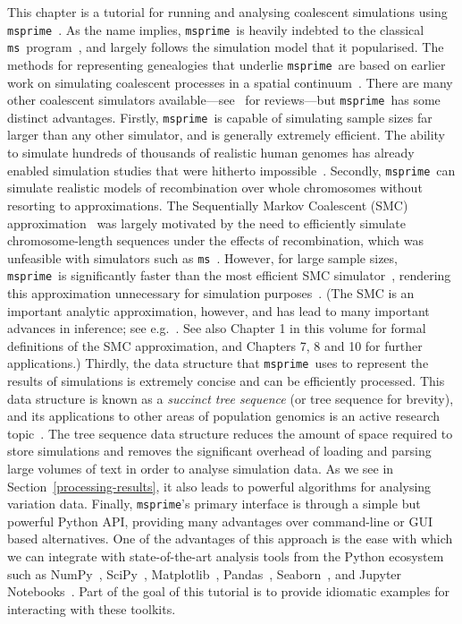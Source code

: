 \documentclass[graybox]{svmult}
\newcommand{\msprime}[0]{\texttt{msprime}}
\newcommand{\ms}[0]{\texttt{ms}}
\begin{document}
This chapter is a tutorial for running and analysing coalescent simulations
using \msprime~\citep{kelleher2016efficient}.
As the name implies, \msprime\ is heavily indebted to the classical
\ms\ program~\citep{hudson2002generating}, and largely follows the
simulation model that it popularised. The methods for representing
genealogies that underlie \msprime\ are based on earlier work on simulating coalescent
processes in a spatial
continuum~\citep{kelleher2013coalescent,kelleher2014coalescent}.
There are many other coalescent simulators available---see~\citep{carvajal2008simulation,liu2008survey,arenas2012simulation,
yuan2012overview,hoban2012computer} for reviews---but \msprime\ has
some distinct advantages. Firstly, \msprime\ is capable of simulating
sample sizes far larger than any other simulator, and is generally
extremely efficient. The ability to simulate
hundreds of thousands of realistic human genomes has already enabled simulation studies that were hitherto impossible~\citep{martin2017human}.
Secondly, \msprime\ can simulate realistic models of recombination over
whole chromosomes without resorting to approximations. The
Sequentially Markov Coalescent (SMC)
approximation~\citep{mcvean2005approximating} was largely motivated by the
need to efficiently simulate chromosome-length sequences under the effects of
recombination,
which was unfeasible with simulators such as \ms~\citep{hudson2002generating}.
However, for large sample sizes, \msprime\ is significantly
faster than the most efficient SMC simulator~\citep{staab2014scrm},
rendering this approximation unnecessary for simulation
purposes~\citep{kelleher2016efficient}.
(The SMC is an important analytic approximation, however, and has lead to many important advances in inference; see e.g.~\citep{
li2011inference,
harris2013inferring,
schiffels2014inferring,
rasmussen2014genome}. See also Chapter 1 in this volume for formal definitions
of the SMC approximation, and Chapters 7, 8 and 10 for further applications.)
Thirdly, the data structure that \msprime\ uses
to represent the results of simulations is extremely concise and
can be efficiently processed. This data structure is known as a
\emph{succinct tree sequence} (or tree sequence for brevity),
and its applications to other areas
of population genomics is an active research
topic~\citep{kelleher2018efficient}. The tree sequence data
structure reduces the amount of space
required to store simulations and removes the significant
overhead of loading and parsing large volumes of text in order to analyse
simulation data. As we see in Section~\ref{processing-results}, it also
leads to powerful algorithms for analysing variation data. Finally,
\msprime's primary interface is through a simple but powerful Python
API, providing many advantages over command-line or GUI based alternatives.
One of the advantages of this approach is the ease with which we
can integrate with state-of-the-art analysis tools from the Python
ecosystem such as NumPy~\citep{walt2011numpy}, SciPy~\citep{jones-2018-scipy},
Matplotlib~\citep{hunter2007matplotlib}, Pandas~\citep{mckinney2010data},
Seaborn~\citep{michael_waskom_2017_883859}, and
Jupyter Notebooks~\citep{perez2007ipython}. Part of the goal
of this tutorial is to provide idiomatic examples for interacting
with these toolkits.
\end{document}
